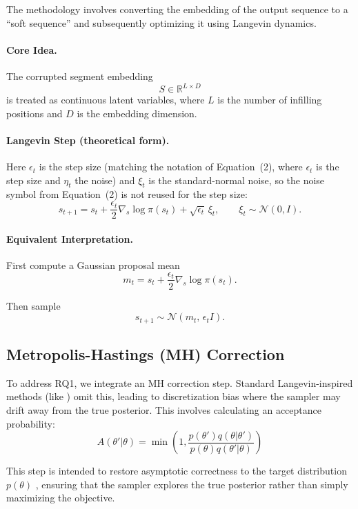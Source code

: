 \documentclass[11pt]{article}
\begin{document}
The methodology involves converting the embedding of the output sequence to a ``soft sequence'' and subsequently optimizing it using Langevin dynamics.

\paragraph{Core Idea.}
The corrupted segment embedding 
\[
S \in \mathbb{R}^{L \times D}
\]
is treated as continuous latent variables, where $L$ is the number of infilling positions and $D$ is the embedding dimension.
\paragraph{Langevin Step (theoretical form).}
Here $\epsilon_t$ is the step size (matching the notation of Equation~(2), where $\epsilon_t$ is the step size and $\eta_t$ the noise) and $\xi_t$ is the standard-normal noise, so the noise symbol from Equation~(2) is not reused for the step size:
\[
s_{t+1}
=
s_t
+
\frac{\epsilon_t}{2} \nabla_s \log \pi(s_t)
+
\sqrt{\epsilon_t}\,\xi_t,
\qquad
\xi_t \sim \mathcal{N}(0, I).
\]

\paragraph{Equivalent Interpretation.}
First compute a Gaussian proposal mean
\[
m_t
=
s_t
+
\frac{\epsilon_t}{2} \nabla_s \log \pi(s_t).
\]

Then sample
\[
s_{t+1}
\sim
\mathcal{N}\!\left(
m_t,\,
\epsilon_t I
\right).
\]

\subsection{Metropolis-Hastings (MH) Correction}
To address RQ1, we integrate an MH correction step. Standard Langevin-inspired methods (like \cite{10.5555/3600270.3600963}) omit this, leading to discretization bias where the sampler may drift away from the true posterior. This involves calculating an acceptance probability:
$$A(\theta'|\theta) = \min\left(1, \frac{p(\theta')q(\theta|\theta')}{p(\theta)q(\theta'|\theta)}\right)$$


This step is intended to restore asymptotic correctness to the target distribution 
$p(\theta)$
, ensuring that the sampler explores the true posterior rather than simply maximizing the objective.
\end{document}
